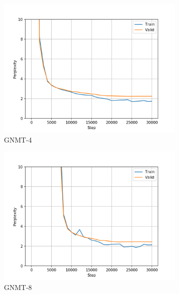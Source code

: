 \begin{figure}[H]
\begin{subfigure}{0.45\textwidth}
\includegraphics[width=\textwidth]{../results/dbnqa1/run1/wmt16_gnmt_4_layer/ppls.png} 
\caption{GNMT-4}
\label{fig:dbnqa gnmt4 ppl}
\end{subfigure}
\hfill
\begin{subfigure}{0.45\textwidth}
\includegraphics[width=\textwidth]{../results/dbnqa1/run1/wmt16_gnmt_8_layer/ppls.png}
\caption{GNMT-8}
\label{fig:dbnqa gnmt8 ppl}
\end{subfigure}
\hfill
\begin{subfigure}{0.45\textwidth}

\end{subfigure}
\end{figure}
